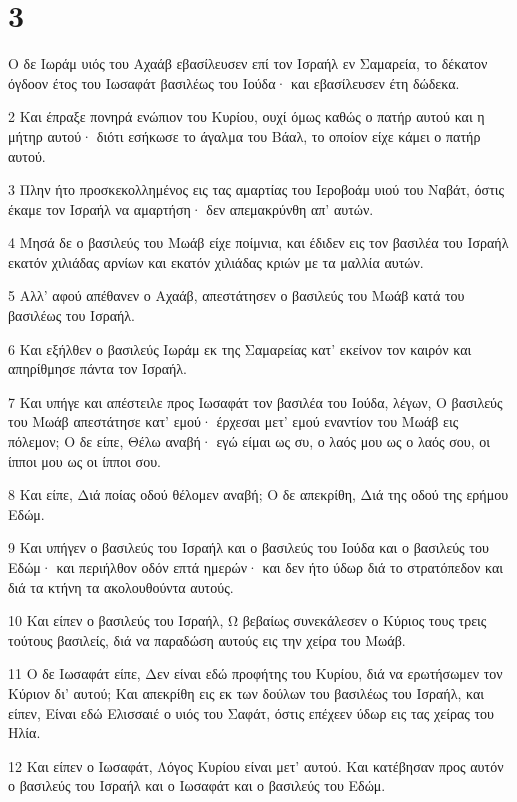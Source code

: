 \chapter{3}

\par Ο δε Ιωράμ υιός του Αχαάβ εβασίλευσεν επί τον Ισραήλ εν Σαμαρεία, το δέκατον όγδοον έτος του Ιωσαφάτ βασιλέως του Ιούδα· και εβασίλευσεν έτη δώδεκα.
\par 2 Και έπραξε πονηρά ενώπιον του Κυρίου, ουχί όμως καθώς ο πατήρ αυτού και η μήτηρ αυτού· διότι εσήκωσε το άγαλμα του Βάαλ, το οποίον είχε κάμει ο πατήρ αυτού.
\par 3 Πλην ήτο προσκεκολλημένος εις τας αμαρτίας του Ιεροβοάμ υιού του Ναβάτ, όστις έκαμε τον Ισραήλ να αμαρτήση· δεν απεμακρύνθη απ' αυτών.
\par 4 Μησά δε ο βασιλεύς του Μωάβ είχε ποίμνια, και έδιδεν εις τον βασιλέα του Ισραήλ εκατόν χιλιάδας αρνίων και εκατόν χιλιάδας κριών με τα μαλλία αυτών.
\par 5 Αλλ' αφού απέθανεν ο Αχαάβ, απεστάτησεν ο βασιλεύς του Μωάβ κατά του βασιλέως του Ισραήλ.
\par 6 Και εξήλθεν ο βασιλεύς Ιωράμ εκ της Σαμαρείας κατ' εκείνον τον καιρόν και απηρίθμησε πάντα τον Ισραήλ.
\par 7 Και υπήγε και απέστειλε προς Ιωσαφάτ τον βασιλέα του Ιούδα, λέγων, Ο βασιλεύς του Μωάβ απεστάτησε κατ' εμού· έρχεσαι μετ' εμού εναντίον του Μωάβ εις πόλεμον; Ο δε είπε, Θέλω αναβή· εγώ είμαι ως συ, ο λαός μου ως ο λαός σου, οι ίπποι μου ως οι ίπποι σου.
\par 8 Και είπε, Διά ποίας οδού θέλομεν αναβή; Ο δε απεκρίθη, Διά της οδού της ερήμου Εδώμ.
\par 9 Και υπήγεν ο βασιλεύς του Ισραήλ και ο βασιλεύς του Ιούδα και ο βασιλεύς του Εδώμ· και περιήλθον οδόν επτά ημερών· και δεν ήτο ύδωρ διά το στρατόπεδον και διά τα κτήνη τα ακολουθούντα αυτούς.
\par 10 Και είπεν ο βασιλεύς του Ισραήλ, Ω βεβαίως συνεκάλεσεν ο Κύριος τους τρεις τούτους βασιλείς, διά να παραδώση αυτούς εις την χείρα του Μωάβ.
\par 11 Ο δε Ιωσαφάτ είπε, Δεν είναι εδώ προφήτης του Κυρίου, διά να ερωτήσωμεν τον Κύριον δι' αυτού; Και απεκρίθη εις εκ των δούλων του βασιλέως του Ισραήλ, και είπεν, Είναι εδώ Ελισσαιέ ο υιός του Σαφάτ, όστις επέχεεν ύδωρ εις τας χείρας του Ηλία.
\par 12 Και είπεν ο Ιωσαφάτ, Λόγος Κυρίου είναι μετ' αυτού. Και κατέβησαν προς αυτόν ο βασιλεύς του Ισραήλ και ο Ιωσαφάτ και ο βασιλεύς του Εδώμ.

